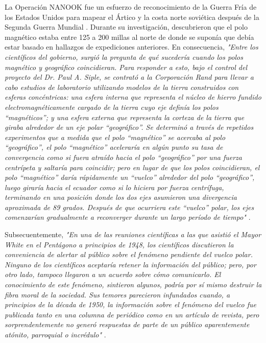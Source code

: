 \documentclass[10pt,twocolumn,letterpaper]{article}
\begin{document}
La Operación NANOOK fue un esfuerzo de reconocimiento de la Guerra Fría de los Estados Unidos para mapear el Ártico y la costa norte soviética después de la Segunda Guerra Mundial \cite{137}. Durante su investigación, descubrieron que el polo magnético estaba entre 125 a 200 millas al norte de donde se suponía que debía estar basado en hallazgos de expediciones anteriores. En consecuencia, \textit{"Entre los científicos del gobierno, surgió la pregunta de qué sucedería cuando los polos magnético y geográfico coincidieran. Para responder a esto, bajo el control del proyecto del Dr. Paul A. Siple, se contrató a la Corporación Rand para llevar a cabo estudios de laboratorio utilizando modelos de la tierra construidos con esferas concéntricas: una esfera interna que representa el núcleo de hierro fundido electromagnéticamente cargado de la tierra cuyo eje definía los polos “magnéticos”; y una esfera externa que representa la corteza de la tierra que giraba alrededor de un eje polar “geográfico”. Se determinó a través de repetidos experimentos que a medida que el polo “magnético” se acercaba al polo “geográfico”, el polo “magnético” aceleraría en algún punto su tasa de convergencia como si fuera atraído hacia el polo “geográfico” por una fuerza centrípeta y saltaría para coincidir; pero en lugar de que los polos coincidieran, el polo “magnético” daría rápidamente un “vuelco” alrededor del polo “geográfico”, luego giraría hacia el ecuador como si lo hiciera por fuerza centrífuga, terminando en una posición donde los dos ejes asumieron una divergencia aproximada de 89 grados. Después de que ocurriera este “vuelco” polar, los ejes comenzarían gradualmente a reconverger durante un largo período de tiempo"} \cite{138,139}.

Subsecuentemente, \textit{"En una de las reuniones científicas a las que asistió el Mayor White en el Pentágono a principios de 1948, los científicos discutieron la conveniencia de alertar al público sobre el fenómeno pendiente del vuelco polar. Ninguno de los científicos aceptaría retener la información del público; pero, por otro lado, tampoco llegaron a un acuerdo sobre cómo comunicarlo. El conocimiento de este fenómeno, sintieron algunos, podría por sí mismo destruir la fibra moral de la sociedad. Sus temores parecieron infundados cuando, a principios de la década de 1950, la información sobre el fenómeno del vuelco fue publicada tanto en una columna de periódico como en un artículo de revista, pero sorprendentemente no generó respuestas de parte de un público aparentemente atónito, parroquial o incrédulo"} \cite{138,139}.
\end{document}
